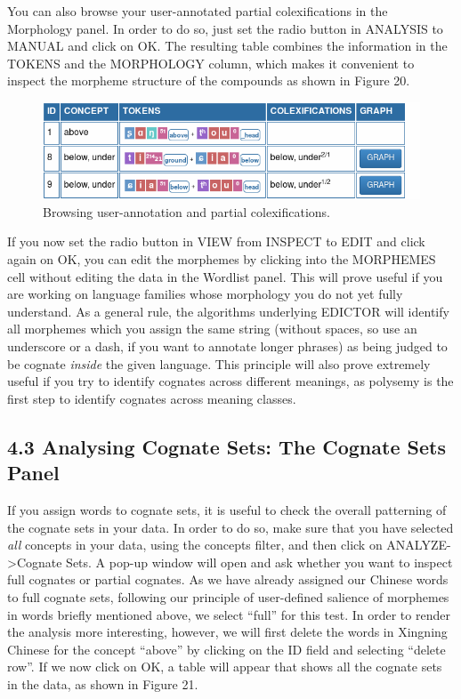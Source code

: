 \documentclass[a4paper,svgnames]{scrartcl}
\begin{document}
You can also browse your user-annotated partial colexifications in the
Morphology panel. In order to do so, just set the radio button in
ANALYSIS to MANUAL and click on OK. The resulting table combines the
information in the TOKENS and the MORPHOLOGY column, which makes it
convenient to inspect the morpheme structure of the compounds as shown in Figure 20.

\begin{figure}
\centering
\includegraphics{images/figure-20.png}
\caption{Browsing user-annotation and partial
colexifications.}
\end{figure}

If you now set the radio button in VIEW from INSPECT to EDIT and click
again on OK, you can edit the morphemes by clicking into the MORPHEMES
cell without editing the data in the Wordlist panel. This will prove
useful if you are working on language families whose morphology you do
not yet fully understand. As a general rule, the algorithms underlying
EDICTOR will identify all morphemes which you assign the same string
(without spaces, so use an underscore or a dash, if you want to annotate
longer phrases) as being judged to be cognate \emph{inside} the given
language. This principle will also prove extremely useful if you try to
identify cognates across different meanings, as polysemy is the first
step to identify cognates across meaning classes.

\subsection*{4.3 Analysing Cognate Sets: The Cognate Sets
Panel}\label{analysing-cognate-sets-the-cognate-sets-panel}

If you assign words to cognate sets, it is useful to check the overall
patterning of the cognate sets in your data. In order to do so, make
sure that you have selected \emph{all} concepts in your data, using the
concepts filter, and then click on ANALYZE-\textgreater{}Cognate Sets. A
pop-up window will open and ask whether you want to inspect full
cognates or partial cognates. As we have already assigned our Chinese
words to full cognate sets, following our principle of user-defined
salience of morphemes in words briefly mentioned above, we select
``full'' for this test. In order to render the analysis more
interesting, however, we will first delete the words in Xingning Chinese
for the concept ``above'' by clicking on the ID field and selecting
``delete row''. If we now click on OK, a table will appear that shows
all the cognate sets in the data, as shown in Figure 21.
\end{document}
